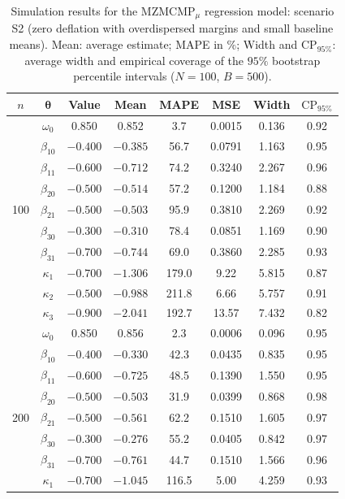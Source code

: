 \begin{table}[pos=htbp]
	\centering
	\caption{Simulation results for the $\mathrm{MZMCMP}_{\mu}$ regression model: scenario S2 (zero deflation with overdispersed margins and small baseline means). Mean: average estimate; MAPE in \%; Width and $\mathrm{CP}_{95\%}$: average width and empirical coverage of the $95\%$ bootstrap percentile intervals ($N=100$, $B=500$).}
	\label{tab:sim_S2}
	\begin{tabular}{@{}cccccccc@{}}
		\toprule
		$n$ & $\bm{\theta}$ & Value & Mean & MAPE & MSE & Width & $\mathrm{CP}_{95\%}$ \\
		\midrule
		 & $\omega_0$ & 0.850 & 0.852 & 3.7 & 0.0015 & 0.136 & 0.92 \\
		 & $\beta_{10}$ & $-0.400$ & $-0.385$ & 56.7 & 0.0791 & 1.163 & 0.95 \\
		 & $\beta_{11}$ & $-0.600$ & $-0.712$ & 74.2 & 0.3240 & 2.267 & 0.96 \\
		 & $\beta_{20}$ & $-0.500$ & $-0.514$ & 57.2 & 0.1200 & 1.184 & 0.88 \\
		100 & $\beta_{21}$ & $-0.500$ & $-0.503$ & 95.9 & 0.3810 & 2.269 & 0.92 \\
		 & $\beta_{30}$ & $-0.300$ & $-0.310$ & 78.4 & 0.0851 & 1.169 & 0.90 \\
		 & $\beta_{31}$ & $-0.700$ & $-0.744$ & 69.0 & 0.3860 & 2.285 & 0.93 \\
		 & $\kappa_1$ & $-0.700$ & $-1.306$ & 179.0 & 9.22 & 5.815 & 0.87 \\
		 & $\kappa_2$ & $-0.500$ & $-0.988$ & 211.8 & 6.66 & 5.757 & 0.91 \\
		 & $\kappa_3$ & $-0.900$ & $-2.041$ & 192.7 & 13.57 & 7.432 & 0.82 \\
		\midrule
		 & $\omega_0$ & 0.850 & 0.856 & 2.3 & 0.0006 & 0.096 & 0.95 \\
		 & $\beta_{10}$ & $-0.400$ & $-0.330$ & 42.3 & 0.0435 & 0.835 & 0.95 \\
		 & $\beta_{11}$ & $-0.600$ & $-0.725$ & 48.5 & 0.1390 & 1.550 & 0.95 \\
		 & $\beta_{20}$ & $-0.500$ & $-0.503$ & 31.9 & 0.0399 & 0.868 & 0.98 \\
		200 & $\beta_{21}$ & $-0.500$ & $-0.561$ & 62.2 & 0.1510 & 1.605 & 0.97 \\
		 & $\beta_{30}$ & $-0.300$ & $-0.276$ & 55.2 & 0.0405 & 0.842 & 0.97 \\
		 & $\beta_{31}$ & $-0.700$ & $-0.761$ & 44.7 & 0.1510 & 1.566 & 0.96 \\
		 & $\kappa_1$ & $-0.700$ & $-1.045$ & 116.5 & 5.00 & 4.259 & 0.93 \\

\end{tabular}
\end{table}
